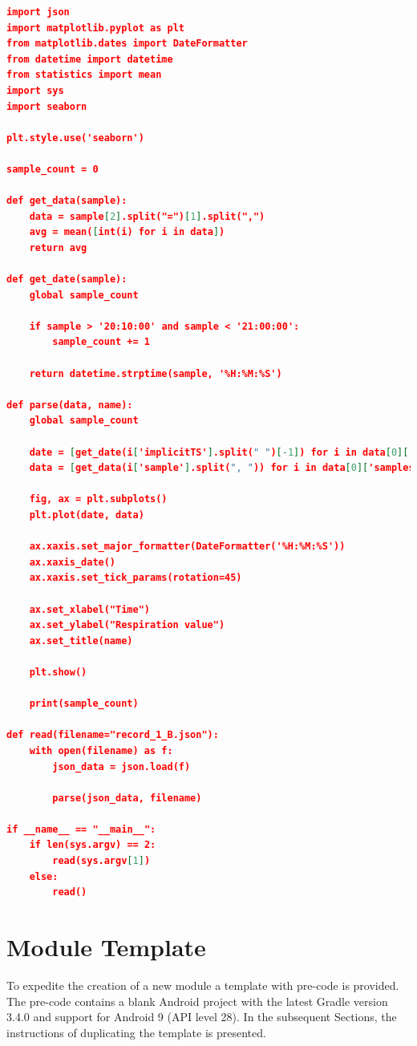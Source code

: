 \begin{lstlisting}[language=json, caption={}, captionpos=b]
import json
import matplotlib.pyplot as plt
from matplotlib.dates import DateFormatter
from datetime import datetime
from statistics import mean
import sys 
import seaborn

plt.style.use('seaborn')

sample_count = 0

def get_data(sample):
    data = sample[2].split("=")[1].split(",")
    avg = mean([int(i) for i in data])
    return avg

def get_date(sample):
    global sample_count

    if sample > '20:10:00' and sample < '21:00:00':
        sample_count += 1

    return datetime.strptime(sample, '%H:%M:%S')

def parse(data, name):
    global sample_count

    date = [get_date(i['implicitTS'].split(" ")[-1]) for i in data[0]['samples']]
    data = [get_data(i['sample'].split(", ")) for i in data[0]['samples']]

    fig, ax = plt.subplots()
    plt.plot(date, data)

    ax.xaxis.set_major_formatter(DateFormatter('%H:%M:%S'))
    ax.xaxis_date()
    ax.xaxis.set_tick_params(rotation=45)

    ax.set_xlabel("Time")
    ax.set_ylabel("Respiration value")
    ax.set_title(name)

    plt.show()
    
    print(sample_count)

def read(filename="record_1_B.json"):
    with open(filename) as f:
        json_data = json.load(f)

        parse(json_data, filename)

if __name__ == "__main__":
    if len(sys.argv) == 2:
        read(sys.argv[1])
    else:
        read()
\end{lstlisting}


\chapter{Module Template}
To expedite the creation of a new module a template with pre-code is provided. The pre-code contains a blank Android project with the latest Gradle version 3.4.0 and support for Android 9 (API level 28). In the subsequent Sections, the instructions of duplicating the template is presented. 




